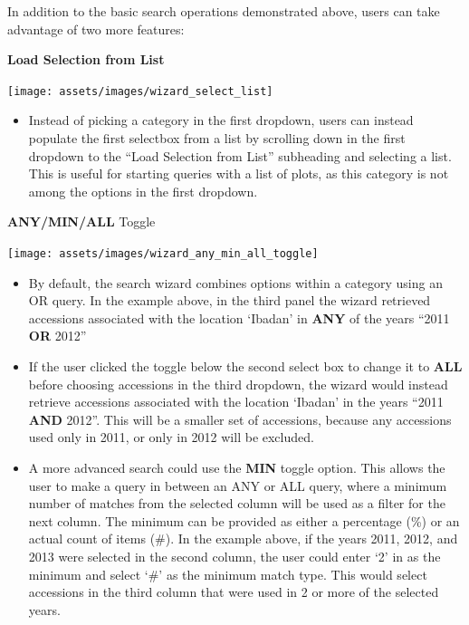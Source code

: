 \documentclass[
  12pt,
]{book}
\providecommand{\tightlist}{%
  \setlength{\itemsep}{0pt}\setlength{\parskip}{0pt}}
\begin{document}
In addition to the basic search operations demonstrated above, users can take advantage of two more features:

\textbf{Load Selection from List}

\begin{center}\texttt{[image: assets/images/wizard\_select\_list]} \end{center}

\begin{itemize}
\tightlist
\item
  Instead of picking a category in the first dropdown, users can instead populate the first selectbox from a list by scrolling down in the first dropdown to the ``Load Selection from List'' subheading and selecting a list. This is useful for starting queries with a list of plots, as this category is not among the options in the first dropdown.
\end{itemize}

\textbf{ANY/MIN/ALL} Toggle

\begin{center}\texttt{[image: assets/images/wizard\_any\_min\_all\_toggle]} \end{center}

\begin{itemize}
\item
  By default, the search wizard combines options within a category using an OR query. In the example above, in the third panel the wizard retrieved accessions associated with the location `Ibadan' in \textbf{ANY} of the years ``2011 \textbf{OR} 2012''
\item
  If the user clicked the toggle below the second select box to change it to \textbf{ALL} before choosing accessions in the third dropdown, the wizard would instead retrieve accessions associated with the location `Ibadan' in the years ``2011 \textbf{AND} 2012''. This will be a smaller set of accessions, because any accessions used only in 2011, or only in 2012 will be excluded.
\item
  A more advanced search could use the \textbf{MIN} toggle option. This allows the user to make a query in between an ANY or ALL query, where a minimum number of matches from the selected column will be used as a filter for the next column. The minimum can be provided as either a percentage (\%) or an actual count of items (\#). In the example above, if the years 2011, 2012, and 2013 were selected in the second column, the user could enter `2' in as the minimum and select `\#' as the minimum match type. This would select accessions in the third column that were used in 2 or more of the selected years.
\end{itemize}
\end{document}
